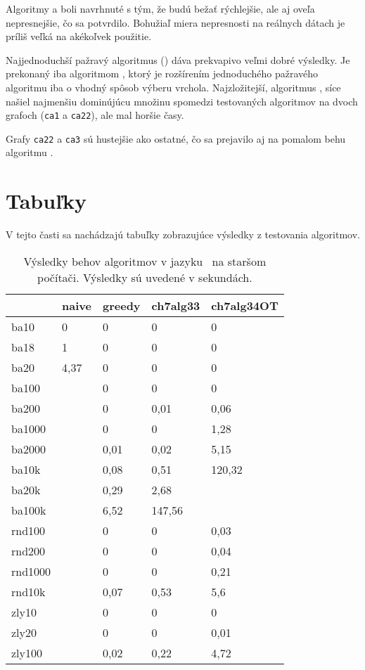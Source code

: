 Algoritmy  a  boli navrhnuté s tým, že budú bežať 
rýchlejšie, ale aj oveľa nepresnejšie, čo sa potvrdilo. Bohužiaľ miera 
nepresnosti na reálnych dátach je príliš veľká na akékoľvek použitie.

Najjednoduchší pažravý algoritmus () dáva 
prekvapivo veľmi dobré výsledky. Je prekonaný iba algoritmom , 
ktorý je rozšírením jednoduchého pažravého algoritmu iba o vhodný spôsob 
výberu vrchola. Najzložitejší, algoritmus , síce našiel najmenšiu 
dominújúcu množinu spomedzi testovaných algoritmov na dvoch grafoch 
(\texttt{ca1} a \texttt{ca22}), ale mal horšie časy. 

Grafy \texttt{ca22} a \texttt{ca3} sú hustejšie ako ostatné, čo sa prejavilo aj 
na pomalom behu algoritmu .

\section{Tabuľky}

V tejto časti sa nachádzajú tabuľky zobrazujúce výsledky z testovania 
algoritmov.

\begin{table}[h]
	\centering
	\begin{tabular}{lllll}
		\hline
		& naive & greedy & ch7alg33 & ch7alg34OT \\ \hline
		ba10    & 0     & 0      & 0        & 0          \\
		ba18    & 1     & 0      & 0        & 0          \\
		ba20    & 4,37  & 0      & 0        & 0          \\
		ba100   &       & 0      & 0        & 0          \\
		ba200   &       & 0      & 0,01     & 0,06       \\
		ba1000  &       & 0      & 0        & 1,28       \\
		ba2000  &       & 0,01   & 0,02     & 5,15       \\
		ba10k   &       & 0,08   & 0,51     & 120,32     \\
		ba20k   &       & 0,29   & 2,68     &            \\
		ba100k  &       & 6,52   & 147,56   &            \\
		rnd100  &       & 0      & 0        & 0,03       \\
		rnd200  &       & 0      & 0        & 0,04       \\
		rnd1000 &       & 0      & 0        & 0,21       \\
		rnd10k  &       & 0,07   & 0,53     & 5,6        \\
		zly10   &       & 0      & 0        & 0          \\
		zly20   &       & 0      & 0        & 0,01       \\
		zly100  &       & 0,02   & 0,22     & 4,72       \\ \hline
	\end{tabular}
	\caption{Výsledky behov algoritmov v jazyku \cpp\ na staršom počítači. Výsledky sú uvedené v sekundách.}
	\label{table:cpp}
\end{table}

